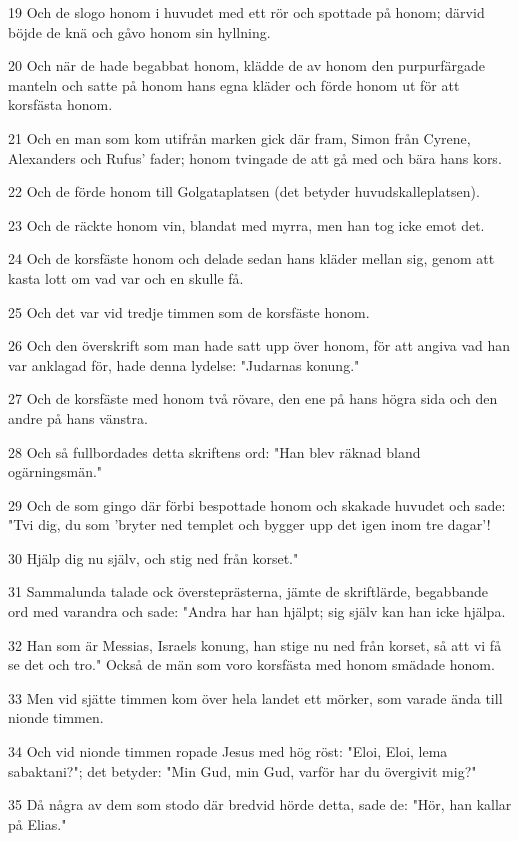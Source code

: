 \par 19 Och de slogo honom i huvudet med ett rör och spottade på honom; därvid böjde de knä och gåvo honom sin hyllning.
\par 20 Och när de hade begabbat honom, klädde de av honom den purpurfärgade manteln och satte på honom hans egna kläder och förde honom ut för att korsfästa honom.
\par 21 Och en man som kom utifrån marken gick där fram, Simon från Cyrene, Alexanders och Rufus' fader; honom tvingade de att gå med och bära hans kors.
\par 22 Och de förde honom till Golgataplatsen (det betyder huvudskalleplatsen).
\par 23 Och de räckte honom vin, blandat med myrra, men han tog icke emot det.
\par 24 Och de korsfäste honom och delade sedan hans kläder mellan sig, genom att kasta lott om vad var och en skulle få.
\par 25 Och det var vid tredje timmen som de korsfäste honom.
\par 26 Och den överskrift som man hade satt upp över honom, för att angiva vad han var anklagad för, hade denna lydelse: "Judarnas konung."
\par 27 Och de korsfäste med honom två rövare, den ene på hans högra sida och den andre på hans vänstra.
\par 28 Och så fullbordades detta skriftens ord: "Han blev räknad bland ogärningsmän."
\par 29 Och de som gingo där förbi bespottade honom och skakade huvudet och sade: "Tvi dig, du som 'bryter ned templet och bygger upp det igen inom tre dagar'!
\par 30 Hjälp dig nu själv, och stig ned från korset."
\par 31 Sammalunda talade ock översteprästerna, jämte de skriftlärde, begabbande ord med varandra och sade: "Andra har han hjälpt; sig själv kan han icke hjälpa.
\par 32 Han som är Messias, Israels konung, han stige nu ned från korset, så att vi få se det och tro." Också de män som voro korsfästa med honom smädade honom.
\par 33 Men vid sjätte timmen kom över hela landet ett mörker, som varade ända till nionde timmen.
\par 34 Och vid nionde timmen ropade Jesus med hög röst: "Eloi, Eloi, lema sabaktani?"; det betyder: "Min Gud, min Gud, varför har du övergivit mig?"
\par 35 Då några av dem som stodo där bredvid hörde detta, sade de: "Hör, han kallar på Elias."
